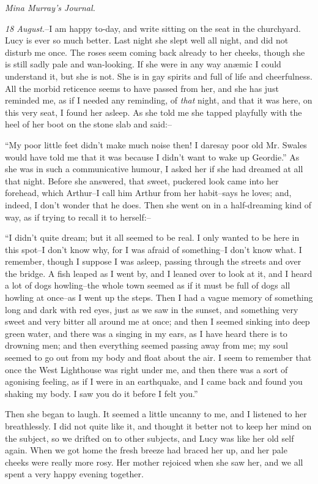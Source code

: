 \documentclass[12pt,openright]{book}
\begin{document}
\textit{Mina Murray’s Journal.}

\textit{18 August.}–I am happy to-day, and write sitting on the seat in the churchyard. Lucy is ever so much better. Last night she slept well all night, and did not disturb me once. The roses seem coming back already to her cheeks, though she is still sadly pale and wan-looking. If she were in any way anæmic I could understand it, but she is not. She is in gay spirits and full of life and cheerfulness. All the morbid reticence seems to have passed from her, and she has just reminded me, as if I needed any reminding, of \textit{that} night, and that it was here, on this very seat, I found her asleep. As she told me she tapped playfully with the heel of her boot on the stone slab and said:–

“My poor little feet didn’t make much noise then! I daresay poor old Mr. Swales would have told me that it was because I didn’t want to wake up Geordie.” As she was in such a communicative humour, I asked her if she had dreamed at all that night. Before she answered, that sweet, puckered look came into her forehead, which Arthur–I call him Arthur from her habit–says he loves; and, indeed, I don’t wonder that he does. Then she went on in a half-dreaming kind of way, as if trying to recall it to herself:–

“I didn’t quite dream; but it all seemed to be real. I only wanted to be here in this spot–I don’t know why, for I was afraid of something–I don’t know what. I remember, though I suppose I was asleep, passing through the streets and over the bridge. A fish leaped as I went by, and I leaned over to look at it, and I heard a lot of dogs howling–the whole town seemed as if it must be full of dogs all howling at once–as I went up the steps. Then I had a vague memory of something long and dark with red eyes, just as we saw in the sunset, and something very sweet and very bitter all around me at once; and then I seemed sinking into deep green water, and there was a singing in my ears, as I have heard there is to drowning men; and then everything seemed passing away from me; my soul seemed to go out from my body and float about the air. I seem to remember that once the West Lighthouse was right under me, and then there was a sort of agonising feeling, as if I were in an earthquake, and I came back and found you shaking my body. I saw you do it before I felt you.”

Then she began to laugh. It seemed a little uncanny to me, and I listened to her breathlessly. I did not quite like it, and thought it better not to keep her mind on the subject, so we drifted on to other subjects, and Lucy was like her old self again. When we got home the fresh breeze had braced her up, and her pale cheeks were really more rosy. Her mother rejoiced when she saw her, and we all spent a very happy evening together.
\end{document}
